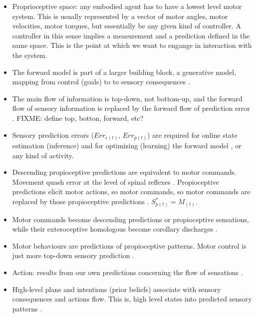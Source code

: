 \documentclass[11pt]{llncs}
\begin{document}
\begin{itemize}

\item Proprioceptive space: any embodied agent has to have a lowest
  level motor system. This is usually represented by a vector of motor
  angles, motor velocities, motor torques, but essentially be any
  given kind of controller. A controller in this sense implies a
  measurement and a prediction defined in the same space. This is the
  point at which we want to engange in interaction with the
  system.

\item The forward model is part of a larger building block, a
  generative model, mapping from control (goals) to to sensory
  consequences \citep{friston2011}.

\item The main flow of information is top-down, not bottom-up, and the
  forward flow of sensory information is replaced by the forward flow
  of prediction error \citep{clark2015}. FIXME: define top, botton,
  forward, etc?

\item Sensory prediction errors ($Err_{e(t)}$, $Err_{p(t)}$) are
  required for online state estimation (inference) and for optimizing
  (learning) the forward model \citep{friston2011}, or any kind of
  activity. 

\item Descending propioceptive predictions are equivalent to motor
  commands. Movement quash error at the level of spinal reflexes
  \citep{pickering2014}. Propioceptive predictions elicit motor
  actions, so motor commands, so motor commands are replaced by those
  propioceptive predictions \citep{clark2015}. $S^*_{p(t)}=M_{(t)}$.

\item Motor commands become descending predictions or propioceptive
  sensations, while their exteroceptive homologous become corollary
  discharges \citep{friston2011}.

\item Motor behaviours are predictions of propioceptive
  patterns. Motor control is just more top-down sensory prediction
  \citep{clark2015}. 

\item Action: results from our own predictions concerning the flow of
  sensations \citep{pickering2014}. 

\item High-level plans and intentions (prior beliefs) associate with
  sensory consequences and actions flow. This is, high level states
  into predicted sensory patterns \citep{pickering2014}.

\end{itemize}
\end{document}

